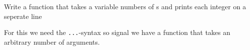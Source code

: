 \begin{Exercise}[title={Var args},difficulty=5]
\label{ex:varargs}
\Question\label{ex:varargs q1}
Write a function that takes a variable numbers of s and prints
each integer on a seperate line
\end{Exercise}

\begin{Answer}
\Question
For this we need the \lstinline{...}-syntax so signal we have a
function that takes an arbitrary number of arguments.



\end{Answer}
